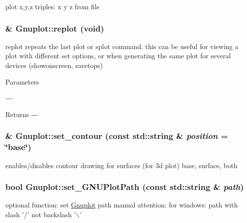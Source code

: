 \label{class_gnuplot_a9dbde2a91eb816481657f3a22c9b0046}
plot x,y,z triples: x y z from file \hypertarget{class_gnuplot_a34c1b3e877d246a841a29f857a29f502}{
\subsubsection[{replot}]{\& Gnuplot::replot (void)}}
\label{class_gnuplot_a34c1b3e877d246a841a29f857a29f502}


replot repeats the last plot or splot command. this can be useful for viewing a plot with different set options, or when generating the same plot for several devices (showonscreen, savetops) 


\begin{DoxyParams}{Parameters}
\item[{\em -\/-\/-\/}]\end{DoxyParams}
\begin{DoxyReturn}{Returns}
-\/-\/-\/ 
\end{DoxyReturn}
\hypertarget{class_gnuplot_af845efc728a90d7e10de764eff0b2423}{
\subsubsection[{set\_\-contour}]{ \& Gnuplot::set\_\-contour (const std::string \& {\em position} = {\ttfamily \char`\"{}base\char`\"{}})}}
\label{class_gnuplot_af845efc728a90d7e10de764eff0b2423}
enables/disables contour drawing for surfaces (for 3d plot) base, surface, both \hypertarget{class_gnuplot_a67cae885c26ced821e335d98986f1967}{
\subsubsection[{set\_\-GNUPlotPath}]{\setlength{\rightskip}{0pt plus 5cm}bool Gnuplot::set\_\-GNUPlotPath (const std::string \& {\em path})}}
\label{class_gnuplot_a67cae885c26ced821e335d98986f1967}


optional function: set \hyperlink{class_gnuplot}{Gnuplot} path manual attention: for windows: path with slash '/' not backslash '$\backslash$' 


